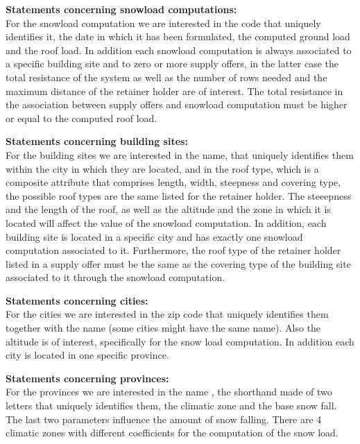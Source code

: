 \documentclass{article}[h]
\begin{document}
\vspace{12px}
\textbf{Statements concerning snowload computations:\\}
For the snowload computation we are interested in the code that uniquely identifies it, the date in which it has been formulated, the computed ground load and the roof load. In addition each snowload computation is always associated to a specific building site and to zero or more supply offers, in the latter case the total resistance of the system as well as the number of rows needed and the maximum distance of the retainer holder are of interest. The total resistance in the association between supply offers and snowload computation must be higher or equal to the computed roof load.

\vspace{12px}
\textbf{Statements concerning building sites:\\}
For the building sites we are interested in the name, that uniquely identifies them within the city in which they are located, and in the roof type, which is a composite attribute that comprises length, width, steepness and covering type, the possible roof types are the same listed for the retainer holder. The steeepness and the length of the roof, as well as the altitude and the zone in which it is located will affect the value of the snowload computation. In addition, each building site is located in a specific city and has exactly one snowload computation associated to it. Furthermore, the roof type of the retainer holder listed in a supply offer must be the same as the covering type of the building site associated to it through the snowload computation.

\vspace{12px}
\textbf{Statements concerning cities:\\}
For the cities we are interested in the zip code that uniquely identifies them together with the name (some cities might have the same name). Also the altitude is of interest, specifically for the snow load computation. In addition each city is located in one specific province.

\vspace{12px}
\textbf{Statements concerning provinces:\\}
For the provinces we are interested in the name , the shorthand made of two letters that uniquely identifies them, the climatic zone and the base snow fall. The last two parameters influence the amount of snow falling. There are 4 climatic zones with different coefficients for the computation of the snow load.
\end{document}
